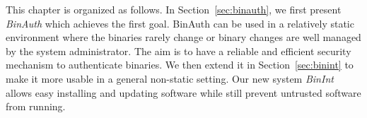 This chapter is organized as follows.
In Section~\ref{sec:binauth},
we first present {\em BinAuth} which achieves the first goal.
BinAuth can be used in a relatively static environment where the binaries 
rarely change or binary changes are well managed by the system administrator.
The aim is to have a reliable and efficient security mechanism
to authenticate binaries.
We then extend it in Section~\ref{sec:binint} to make it more usable
in a general non-static setting.
Our new system {\em BinInt} allows easy installing and updating software
while still prevent untrusted software from running.
